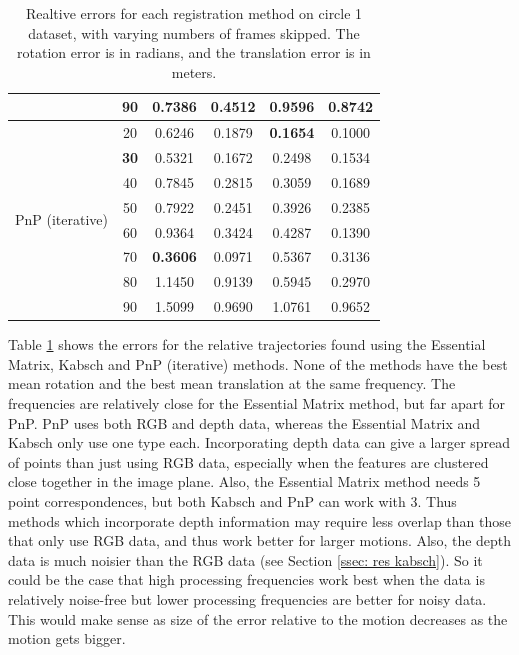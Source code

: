 \documentclass[12pt,a4paper]{article}
\begin{document}
\begin{table}[p]
\begin{tabular}{|c|c|c|c|c|c|}
                              & 90 & \textbf{0.7386} & 0.4512 & 0.9596 & 0.8742 \\
      \hline
      \multirow{8}{*}{PnP (iterative)}  & 20 & 0.6246 & 0.1879 & \textbf{0.1654} & 0.1000 \\
                                        & \textbf{30} & 0.5321 & 0.1672 & 0.2498 & 0.1534 \\
                                        & 40 & 0.7845 & 0.2815 & 0.3059 & 0.1689 \\
                                        & 50 & 0.7922 & 0.2451 & 0.3926 & 0.2385 \\
                                        & 60 & 0.9364 & 0.3424 & 0.4287 & 0.1390 \\
                                        & 70 & \textbf{0.3606} & 0.0971 & 0.5367 & 0.3136 \\
                                        & 80 & 1.1450 & 0.9139 & 0.5945 & 0.2970 \\
                                        & 90 & 1.5099 & 0.9690 & 1.0761 & 0.9652 \\
      \hline
      \end{tabular}\hspace*{-1.5cm}
      \caption{Realtive errors for each registration method on circle 1 dataset, with varying numbers of frames skipped. The rotation error is in radians, and the translation error is in meters.}
      \label{t: res rel skip quad}
    \end{table}

    
    Table \ref{t: res rel skip quad} shows the errors for the relative trajectories found using the Essential Matrix, Kabsch and PnP (iterative) methods. None of the methods have the best mean rotation and the best mean translation at the same frequency. The frequencies are relatively close for the Essential Matrix method, but far apart for PnP. PnP uses both RGB and depth data, whereas the Essential Matrix and Kabsch only use one type each. Incorporating depth data can give a larger spread of points than just using RGB data, especially when the features are clustered close together in the image plane. Also, the Essential Matrix method needs 5 point correspondences, but both Kabsch and PnP can work with 3. Thus methods which incorporate depth information may require less overlap than those that only use RGB data, and thus work better for larger motions. Also, the depth data is much noisier than the RGB data (see Section \ref{ssec: res kabsch}). So it could be the case that high processing frequencies work best when the data is relatively noise-free but lower processing frequencies are better for noisy data. This would make sense as size of the error relative to the motion decreases as the motion gets bigger.
     
\end{document}
